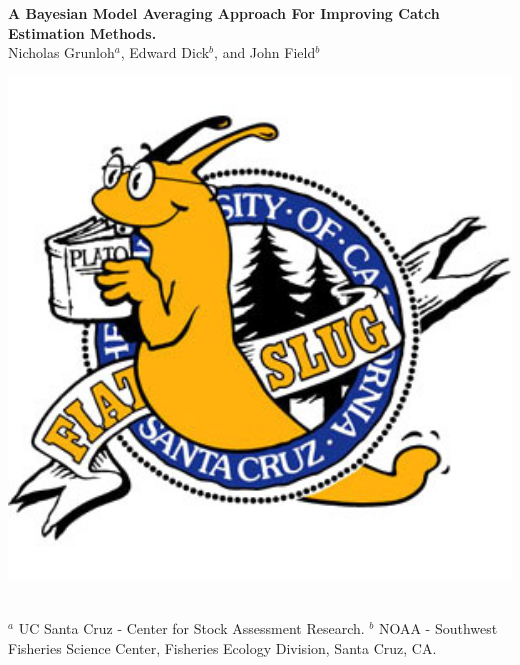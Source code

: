 \documentclass[a0paper,portrait]{baposter}
\begin{document}
\begin{poster}
{\begin{minipage}{0.14\textwidth}
\end{minipage}
\begin{minipage}{0.7\textwidth}
	\begin{center}
	{\huge \textbf{A Bayesian Model Averaging Approach For Improving Catch Estimation Methods.}}\\ %
	\vspace{0.5cm}
	{\Large Nicholas Grunloh$^a$, Edward Dick$^b$, and John Field$^b$}
	\end{center}
\end{minipage}
\begin{minipage}{0.14\textwidth}
	\hspace*{-0.5cm}
	\includegraphics[width=1.2\textwidth]{../pictures/fiatSlug.jpg}
\end{minipage}
\normalsize
\\ \sf
$^a$ UC Santa Cruz - Center for Stock Assessment Research. $^b$ NOAA - Southwest Fisheries Science Center, Fisheries Ecology Division, Santa Cruz, CA.\\
}
\\


\end{poster}
\end{document}

